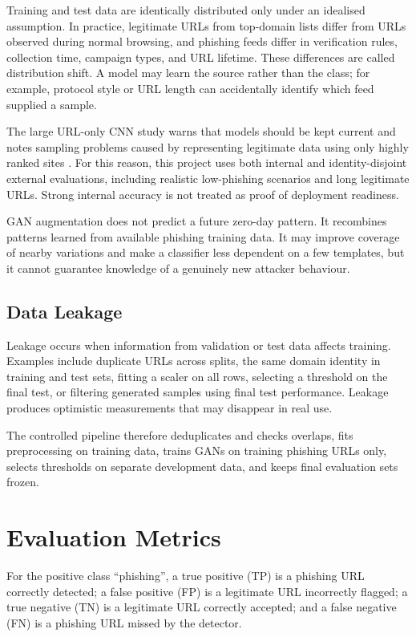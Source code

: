 Training and test data are identically distributed only under an idealised
assumption. In practice, legitimate URLs from top-domain lists differ from URLs
observed during normal browsing, and phishing feeds differ in verification
rules, collection time, campaign types, and URL lifetime. These differences are
called distribution shift. A model may learn the source rather than the class;
for example, protocol style or URL length can accidentally identify which feed
supplied a sample.

The large URL-only CNN study warns that models should be kept current and notes
sampling problems caused by representing legitimate data using only highly
ranked sites \citep{alalyan2020robust}. For this reason, this project uses both
internal and identity-disjoint external evaluations, including realistic
low-phishing scenarios and long legitimate URLs. Strong internal accuracy is
not treated as proof of deployment readiness.

GAN augmentation does not predict a future zero-day pattern. It recombines
patterns learned from available phishing training data. It may improve coverage
of nearby variations and make a classifier less dependent on a few templates,
but it cannot guarantee knowledge of a genuinely new attacker behaviour.

\subsection{Data Leakage}

Leakage occurs when information from validation or test data affects training.
Examples include duplicate URLs across splits, the same domain identity in
training and test sets, fitting a scaler on all rows, selecting a threshold on
the final test, or filtering generated samples using final test performance.
Leakage produces optimistic measurements that may disappear in real use.

The controlled pipeline therefore deduplicates and checks overlaps, fits
preprocessing on training data, trains GANs on training phishing URLs only,
selects thresholds on separate development data, and keeps final evaluation
sets frozen.

\section{Evaluation Metrics}

For the positive class ``phishing'', a true positive (TP) is a phishing URL
correctly detected; a false positive (FP) is a legitimate URL incorrectly
flagged; a true negative (TN) is a legitimate URL correctly accepted; and a
false negative (FN) is a phishing URL missed by the detector.


